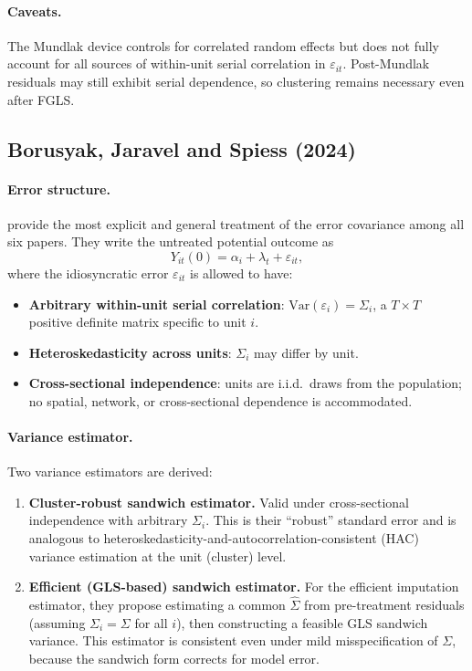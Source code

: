 \documentclass[12pt]{article}
\begin{document}
\paragraph{Caveats.}
The Mundlak device controls for correlated random effects but does not
fully account for all sources of within-unit serial correlation in
$\varepsilon_{it}$.
Post-Mundlak residuals may still exhibit serial dependence, so clustering
remains necessary even after FGLS.

\subsection{Borusyak, Jaravel and Spiess (2024)}

\paragraph{Error structure.}
\citet{borusyak2024revisiting} provide the most explicit and general treatment of
the error covariance among all six papers.
They write the untreated potential outcome as
\[
  Y_{it}(0) = \alpha_i + \lambda_t + \varepsilon_{it},
\]
where the idiosyncratic error $\varepsilon_{it}$ is allowed to have:
\begin{itemize}
  \item \textbf{Arbitrary within-unit serial correlation}: $\mathrm{Var}(\varepsilon_i)
        = \Sigma_i$, a $T \times T$ positive definite matrix specific to unit $i$.
  \item \textbf{Heteroskedasticity across units}: $\Sigma_i$ may differ by unit.
  \item \textbf{Cross-sectional independence}: units are i.i.d.\ draws from the
        population; no spatial, network, or cross-sectional dependence is
        accommodated.
\end{itemize}

\paragraph{Variance estimator.}
Two variance estimators are derived:
\begin{enumerate}
  \item \textbf{Cluster-robust sandwich estimator.}
        Valid under cross-sectional independence with arbitrary $\Sigma_i$.
        This is their ``robust'' standard error and is analogous to
        heteroskedasticity-and-autocorrelation-consistent (HAC) variance
        estimation at the unit (cluster) level.
  \item \textbf{Efficient (GLS-based) sandwich estimator.}
        For the efficient imputation estimator, they propose estimating a common
        $\hat{\Sigma}$ from pre-treatment residuals (assuming $\Sigma_i = \Sigma$
        for all $i$), then constructing a feasible GLS sandwich variance.
        This estimator is consistent even under mild misspecification of $\Sigma$,
        because the sandwich form corrects for model error.
\end{enumerate}
\end{document}
